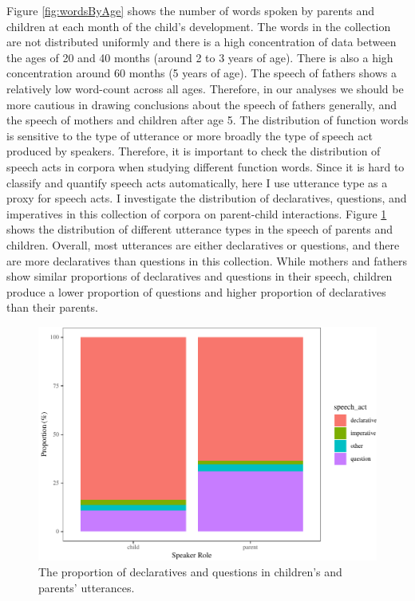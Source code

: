\documentclass[,man,floatsintext]{apa6}
\begin{document}
Figure \ref{fig:wordsByAge} shows the number of words spoken by parents and children at each month of the child's development. The words in the collection are not distributed uniformly and there is a high concentration of data between the ages of 20 and 40 months (around 2 to 3 years of age). There is also a high concentration around 60 months (5 years of age). The speech of fathers shows a relatively low word-count across all ages. Therefore, in our analyses we should be more cautious in drawing conclusions about the speech of fathers generally, and the speech of mothers and children after age 5.
The distribution of function words is sensitive to the type of utterance or more broadly the type of speech act produced by speakers. Therefore, it is important to check the distribution of speech acts in corpora when studying different function words. Since it is hard to classify and quantify speech acts automatically, here I use utterance type as a proxy for speech acts. I investigate the distribution of declaratives, questions, and imperatives in this collection of corpora on parent-child interactions. Figure \ref{fig:totalUtteranceTypePlot} shows the distribution of different utterance types in the speech of parents and children. Overall, most utterances are either declaratives or questions, and there are more declaratives than questions in this collection. While mothers and fathers show similar proportions of declaratives and questions in their speech, children produce a lower proportion of questions and higher proportion of declaratives than their parents.

\begin{figure}[tb]

{\centering \includegraphics{figs/totalUtteranceTypePlot-1} 

}

\caption{The proportion of declaratives and questions in children's and parents' utterances.}\label{fig:totalUtteranceTypePlot}
\end{figure}
\end{document}
